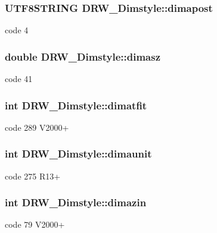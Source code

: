 \subsubsection[{dimapost}]{\setlength{\rightskip}{0pt plus 5cm}U\+T\+F8\+S\+T\+R\+I\+N\+G D\+R\+W\+\_\+\+Dimstyle\+::dimapost}\label{class_d_r_w___dimstyle_a933deca82de6d15d82ada90f8731a00b}
code 4 \hypertarget{class_d_r_w___dimstyle_ae0ea0ac39cd2e961ccf4c3b54c570967}{}
\subsubsection[{dimasz}]{\setlength{\rightskip}{0pt plus 5cm}double D\+R\+W\+\_\+\+Dimstyle\+::dimasz}\label{class_d_r_w___dimstyle_ae0ea0ac39cd2e961ccf4c3b54c570967}
code 41 \hypertarget{class_d_r_w___dimstyle_a573b46a58131b108589f35bb67c9800f}{}
\subsubsection[{dimatfit}]{\setlength{\rightskip}{0pt plus 5cm}int D\+R\+W\+\_\+\+Dimstyle\+::dimatfit}\label{class_d_r_w___dimstyle_a573b46a58131b108589f35bb67c9800f}
code 289 V2000+ \hypertarget{class_d_r_w___dimstyle_a2f0ddeaf2ca3e3dc5a4e35c7fb509939}{}
\subsubsection[{dimaunit}]{\setlength{\rightskip}{0pt plus 5cm}int D\+R\+W\+\_\+\+Dimstyle\+::dimaunit}\label{class_d_r_w___dimstyle_a2f0ddeaf2ca3e3dc5a4e35c7fb509939}
code 275 R13+ \hypertarget{class_d_r_w___dimstyle_a5e3f7207c9924cd3f14b440f1db86f96}{}
\subsubsection[{dimazin}]{\setlength{\rightskip}{0pt plus 5cm}int D\+R\+W\+\_\+\+Dimstyle\+::dimazin}\label{class_d_r_w___dimstyle_a5e3f7207c9924cd3f14b440f1db86f96}
code 79 V2000+ \hypertarget{class_d_r_w___dimstyle_a2f64034b5654fee47038933c565a2e51}{}
